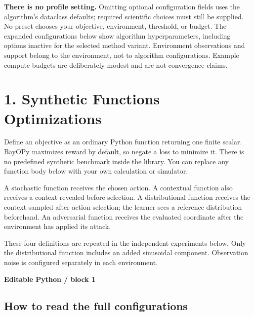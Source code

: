 \documentclass[10pt,a4paper]{article}
\newcommand{\CodeFile}[1]{\VerbatimInput[
  fontsize=\fontsize{8.3}{10.7}\selectfont,breaklines=true,
  breakanywhere=true,breakautoindent=true,tabsize=4,
  frame=leftline,framerule=.5pt,rulecolor=\color{BayopyTeal},
  xleftmargin=5pt,framesep=5pt]{#1}}
\newcommand{\BlockLabel}[1]{\Needspace{4\baselineskip}
  {\small\bfseries\color{BayopyTeal}#1}\par\vspace{-3pt}}
\begin{document}
\textbf{There is no profile setting.} Omitting optional configuration fields uses the algorithm's dataclass defaults; required scientific choices must still be supplied. No preset chooses your objective,\allowbreak{} environment,\allowbreak{} threshold,\allowbreak{} or budget. The expanded configurations below show algorithm hyperparameters,\allowbreak{} including options inactive for the selected method variant. Environment observations and support belong to the environment,\allowbreak{} not to algorithm configurations. Example compute budgets are deliberately modest and are not convergence claims.



\clearpage
{}
\section*{1. Synthetic Functions Optimizations}

Define an objective as an ordinary Python function returning one finite scalar. BayOPy maximizes reward by default,\allowbreak{} so negate a loss to minimize it. There is no predefined synthetic benchmark inside the library. You can replace any function body below with your own calculation or simulator.


A stochastic function receives the chosen action. A contextual function also receives a context revealed before selection. A distributional function receives the context sampled after action selection; the learner sees a reference distribution beforehand. An adversarial function receives the evaluated coordinate after the environment has applied its attack.


These four definitions are repeated in the independent experiments below. Only the distributional function includes an added sinusoidal component. Observation noise is configured separately in each environment.



\BlockLabel{Editable Python / block 1}

\CodeFile{code/cell_02.py}

\subsection*{How to read the full configurations}

\end{document}
